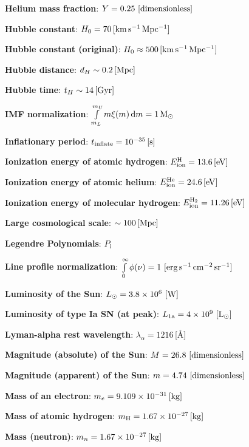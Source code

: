 \documentclass[a4paper,10pt]{article}
\begin{document}
{\noindent}\textbf{Helium mass fraction}: $Y = 0.25 ~ [{\rm dimensionless}]$

{\noindent}\textbf{Hubble constant}: $H_0 = 70\,[{\rm km\,s^{-1}\,Mpc^{-1}}]$

{\noindent}\textbf{Hubble constant (original)}: $H_0 \approx 500\,[{\rm km\,s^{-1}\,Mpc^{-1}}]$

{\noindent}\textbf{Hubble distance}: $d_H \sim 0.2\,[{\rm Mpc}]$

{\noindent}\textbf{Hubble time}: $t_H \sim 14\,[{\rm Gyr}]$

{\noindent}\textbf{IMF normalization}: $\int\limits_{m_L}^{m_U} m\xi(m)\,\mathrm{d}m = 1\,{\rm M}_\odot$

{\noindent}\textbf{Inflationary period}: $t_\mathrm{inflate} = 10^{-35}\,[{\rm s}]$

{\noindent}\textbf{Ionization energy of atomic hydrogen}: $E_\mathrm{ion}^\mathrm{H} = 13.6\,[{\rm eV}]$

{\noindent}\textbf{Ionization energy of atomic helium}: $E_\mathrm{ion}^\mathrm{He} = 24.6\,[{\rm eV}]$

{\noindent}\textbf{Ionization energy of molecular hydrogen}: $E_\mathrm{ion}^\mathrm{H_2} = 11.26\,[{\rm eV}]$

{\noindent}\textbf{Large cosmological scale}: $\sim 100\,[{\rm Mpc}]$

{\noindent}\textbf{Legendre Polynomials}: $P_l$

{\noindent}\textbf{Line profile normalization}: $\int\limits_0^\infty \phi(\nu)=1 ~ [{\rm erg\,s^{-1}\,cm^{-2}\,sr^{-1}}]$

{\noindent}\textbf{Luminosity of the Sun}: $L_\odot=3.8\times10^6 ~ [{\rm W}]$

{\noindent}\textbf{Luminosity of type Ia SN (at peak)}: $L_\mathrm{1a}=4\times10^9 ~ [{\rm L_\odot}]$

{\noindent}\textbf{Lyman-alpha rest wavelength}: $\lambda_\alpha = 1216$\,[\AA]

{\noindent}\textbf{Magnitude (absolute) of the Sun}: $M = 26.8 ~ [{\rm dimensionless}]$

{\noindent}\textbf{Magnitude (apparent) of the Sun}: $m = 4.74 ~ [{\rm dimensionless}]$

{\noindent}\textbf{Mass of an electron}: $m_e = 9.109\times10^{-31}\,[{\rm kg}]$

{\noindent}\textbf{Mass of atomic hydrogen}: $m_{\rm H} = 1.67\times10^{-27}\,[{\rm kg}]$

{\noindent}\textbf{Mass (neutron)}: $m_n = 1.67\times10^{-27}\,[{\rm kg}]$
\end{document}
